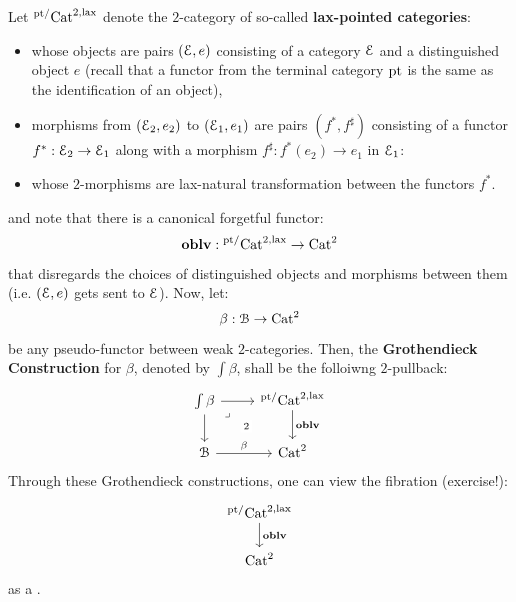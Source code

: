                 \begin{definition} \label{def: grothendieck_construction}
                    Let ${}^{\mathrm{pt}/}\mathrm{Cat}^{2, \mathrm{lax}}$ denote the $2$-category of so-called \textbf{lax-pointed categories}:
                        \begin{itemize}
                            \item whose objects are pairs $(\mathcal{E}, e)$ consisting of a category $\mathcal{E}$ and a distinguished object $e$ (recall that a functor from the terminal category $\mathrm{pt}$ is the same as the identification of an object),
                            \item morphisms from $(\mathcal{E}_2, e_2)$ to $(\mathcal{E}_1, e_1)$ are pairs $(f^*, f^{\sharp})$ consisting of a functor $f^*: \mathcal{E}_2 \to \mathcal{E}_1$ along with a morphism $f^{\sharp}: f^*(e_2) \to e_1$ in $\mathcal{E}_1$:
                            \item whose $2$-morphisms are lax-natural transformation between the functors $f^*$.
                        \end{itemize}
                    and note that there is a canonical forgetful functor:
                        $$\mathbf{oblv}: {}^{\mathrm{pt}/}\mathrm{Cat}^{2, \mathrm{lax}} \to \mathrm{Cat}^2$$
                    that disregards the choices of distinguished objects and morphisms between them (i.e. $(\mathcal{E}, e)$ gets sent to $\mathcal{E}$). Now, let:
                        $$\beta: \mathcal{B} \to \mathrm{Cat}^2$$
                    be any pseudo-functor between weak $2$-categories. Then, the \textbf{Grothendieck Construction} for $\beta$, denoted by $\int \beta$, shall be the folloiwng $2$-pullback:
                        $$
                            \begin{tikzcd}
                            	{\int \beta} & {{}^{\pt/}\Cat^{2, \lax}} \\
                            	\calB & {\Cat^2}
                            	\arrow[from=1-1, to=2-1]
                            	\arrow["\beta", from=2-1, to=2-2]
                            	\arrow["\oblv", from=1-2, to=2-2]
                            	\arrow[from=1-1, to=1-2]
                            	\arrow["2"{description}, "\lrcorner"{anchor=center, pos=0.125}, draw=none, from=1-1, to=2-2]
                            \end{tikzcd}
                        $$
                    Through these Grothendieck constructions, one can view the fibration (exercise!):
                        $$
                            \begin{tikzcd}
                            	{{}^{\pt/}\Cat^{2, \lax}} \\
                            	{\Cat^2}
                            	\arrow["\oblv", from=1-1, to=2-1]
                            \end{tikzcd}
                        $$
                    as a . 
                \end{definition}
